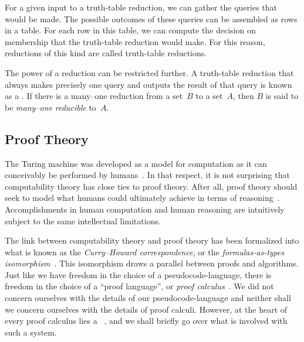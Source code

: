 For a given input to a truth-table reduction, we can gather the queries that would be made.
The possible outcomes of these queries can be assembled as rows in a table.
For each row in this table, we can compute the decision on membership that the truth-table reduction would make.
For this reason, reductions of this kind are called truth-table reductions.

The power of a reduction can be restricted further.
A truth-table reduction that always makes precisely one query and outputs the result of that query is known as a .
If there is a many--one reduction from a set~$B$ to a set~$A$, then $B$ is said to be \emph{many--one reducible} to~$A$.


\subsection{Proof Theory}

The Turing machine was developed as a model for computation as it can conceivably be performed by humans~\parencite[Section~9]{turing1937computable}.
In that respect, it is not surprising that computability theory has close ties to proof theory.
After all, proof theory should seek to model what humans could ultimately achieve in terms of reasoning~\parencite[Section~37]{kleene1967mathematical}.
Accomplishments in human computation and human reasoning are intuitively subject to the same intellectual limitations.

The link between computability theory and proof theory has been formalized into what is known as the \emph{Curry--Howard correspondence}, or the \emph{formulas-as-types isomorphism}~\parencite[Section~2.5]{troelstra2000basic}.
This isomorphism draws a parallel between proofs and algorithms.
Just like we have freedom in the choice of a pseudocode-language, there is freedom in the choice of a \enquote{proof language}, or \emph{proof calculus}~\parencite{kleene1967mathematical,troelstra2000basic}.
We did not concern ourselves with the details of our pseudocode-language and neither shall we concern ourselves with the details of proof calculi.
However, at the heart of every proof calculus lies a ~\parencite{kleene1967mathematical}, and we shall briefly go over what is involved with such a system.

